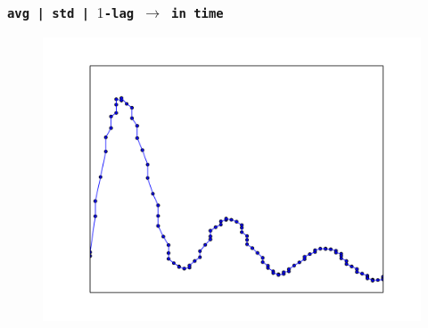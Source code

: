 \documentclass[aspectratio=169]{beamer}
\begin{document}
  \begin{frame}[foot]
    \frametitle{\texttt{avg | std | \texttt{$1$-lag} $\rightarrow$ in time}}
    \begin{figure}
       \vspace*{-2em}
       {
       \hspace*{-2.5em}
       {{

       \colorbox{lightred}{ \includegraphics[height=.41\textheight]{./gfx/feature1.png} }


       \hspace*{0.1em}
       
}}}
\end{figure}
\end{frame}
\end{document}
